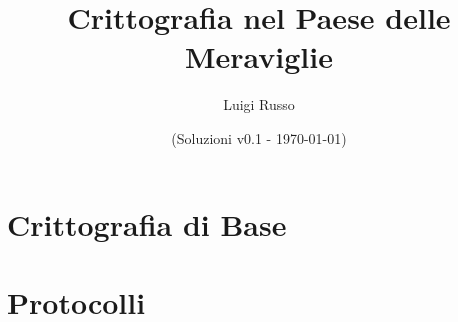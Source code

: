 \documentclass[a4paper,12pt]{memoir}
\begin{document}
\author{Luigi Russo}
\title{Crittografia nel Paese delle Meraviglie}
\date{(Soluzioni v0.1 - \today)}

\frontmatter
\maketitle
\tableofcontents

\mainmatter


\part{Crittografia di Base}


\part{Protocolli}

\backmatter
\end{document}
